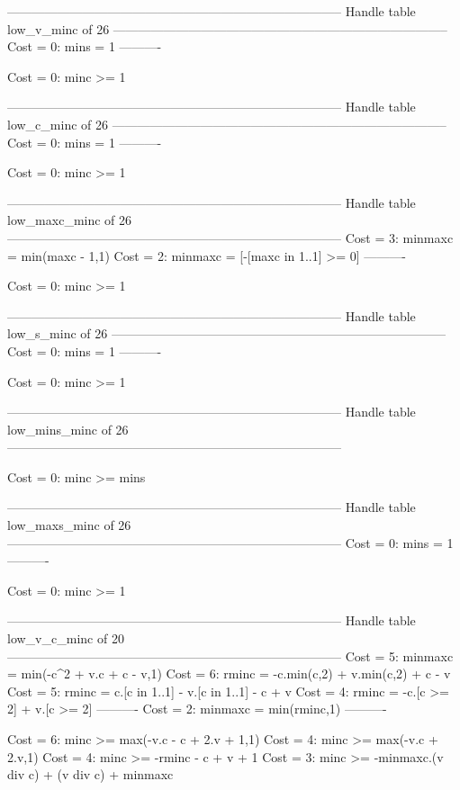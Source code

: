 --------------------------------------------------------------------------------
Handle table low_v_minc of 26
--------------------------------------------------------------------------------
Cost =  0:  mins = 1
----------

Cost =  0:  minc >= 1

--------------------------------------------------------------------------------
Handle table low_c_minc of 26
--------------------------------------------------------------------------------
Cost =  0:  mins = 1
----------

Cost =  0:  minc >= 1

--------------------------------------------------------------------------------
Handle table low_maxc_minc of 26
--------------------------------------------------------------------------------
Cost =  3:  minmaxc = min(maxc - 1,1)
Cost =  2:  minmaxc = [-[maxc in 1..1] >= 0]
----------

Cost =  0:  minc >= 1

--------------------------------------------------------------------------------
Handle table low_s_minc of 26
--------------------------------------------------------------------------------
Cost =  0:  mins = 1
----------

Cost =  0:  minc >= 1

--------------------------------------------------------------------------------
Handle table low_mins_minc of 26
--------------------------------------------------------------------------------

Cost =  0:  minc >= mins

--------------------------------------------------------------------------------
Handle table low_maxs_minc of 26
--------------------------------------------------------------------------------
Cost =  0:  mins = 1
----------

Cost =  0:  minc >= 1

--------------------------------------------------------------------------------
Handle table low_v_c_minc of 20
--------------------------------------------------------------------------------
Cost =  5:  minmaxc = min(-c^2 + v.c + c - v,1)
Cost =  6:  rminc   = -c.min(c,2) + v.min(c,2) + c - v
Cost =  5:  rminc   = c.[c in 1..1] - v.[c in 1..1] - c + v
Cost =  4:  rminc   = -c.[c >= 2] + v.[c >= 2]
----------
Cost =  2:  minmaxc = min(rminc,1)
----------

Cost =  6:  minc >= max(-v.c - c + 2.v + 1,1)
Cost =  4:  minc >= max(-v.c + 2.v,1)
Cost =  4:  minc >= -rminc - c + v + 1
Cost =  3:  minc >= -minmaxc.(v div c) + (v div c) + minmaxc

